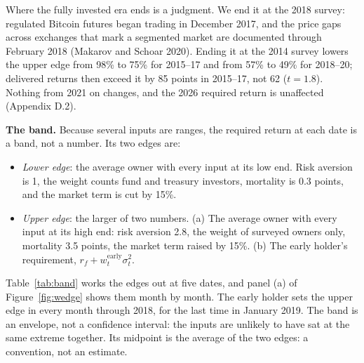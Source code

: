 \documentclass[11pt]{article}
\begin{document}
Where the fully invested era ends is a judgment. We end it at the 2018 survey: regulated Bitcoin futures began trading in December 2017, and the price gaps across exchanges that mark a segmented market are documented through February 2018 (Makarov and Schoar 2020). Ending it at the 2014 survey lowers the upper edge from 98\% to 75\% for 2015--17 and from 57\% to 49\% for 2018--20; delivered returns then exceed it by 85 points in 2015--17, not 62 ($t = 1.8$). Nothing from 2021 on changes, and the 2026 required return is unaffected (Appendix D.2).

\textbf{The band.} Because several inputs are ranges, the required return at each date is a band, not a number. Its two edges are:
\begin{itemize}
\item \emph{Lower edge}: the average owner with every input at its low end. Risk aversion is 1, the weight counts fund and treasury investors, mortality is 0.3 points, and the market term is cut by 15\%.
\item \emph{Upper edge}: the larger of two numbers. (a) The average owner with every input at its high end: risk aversion 2.8, the weight of surveyed owners only, mortality 3.5 points, the market term raised by 15\%. (b) The early holder's requirement, $r_f + w^{\text{early}}_t\sigma_t^2$.
\end{itemize}
Table~\ref{tab:band} works the edges out at five dates, and panel (a) of Figure~\ref{fig:wedge} shows them month by month. The early holder sets the upper edge in every month through 2018, for the last time in January 2019. The band is an envelope, not a confidence interval: the inputs are unlikely to have sat at the same extreme together. Its midpoint is the average of the two edges: a convention, not an estimate.
\end{document}
